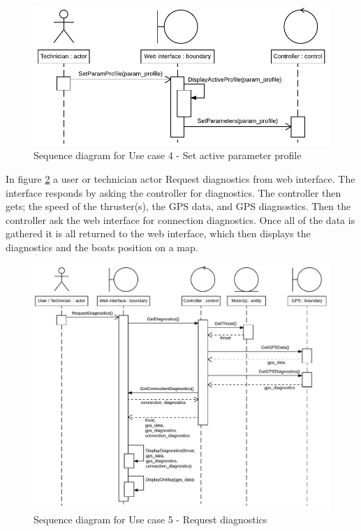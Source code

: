 \begin{figure}[H]
	\centering
	\includegraphics[width=1\linewidth]{Images/System_architecture/Use_case_4_SD}
	\caption{Sequence diagram for Use case 4 - Set active parameter profile}
	\label{fig:seq:uc4}
\end{figure}

In figure \ref{fig:seq:uc5} a user or technician actor Request diagnostics from web interface. The interface responds by asking the controller for diagnostics. The controller then gets; the speed of the thruster(s), the GPS data, and GPS diagnostics. Then the controller ask the web interface for connection diagnostics. Once all of the data is gathered it is all returned to the web interface, which then displays the diagnostics and the boats position on a map.

\begin{figure}[H]
	\centering
	\includegraphics[width=1\linewidth]{Images/System_architecture/Use_case_5_SD}
	\caption{Sequence diagram for Use case 5 - Request diagnostics}
	\label{fig:seq:uc5}
\end{figure}

